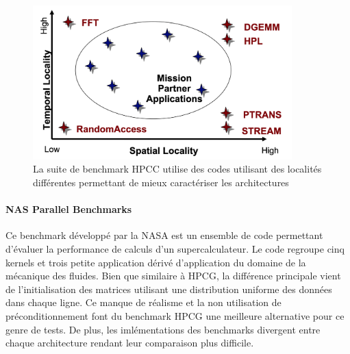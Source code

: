 \begin{figure}
    \center
    \includegraphics[width=10cm]{images/bench_hpcc.png}
    \caption{ La suite de benchmark HPCC utilise des codes utilisant des localités différentes permettant de mieux caractériser les architectures
    \label{pic_bench_hpcc}}
\end{figure}





\paragraph{NAS Parallel Benchmarks} Ce benchmark développé par la NASA est un ensemble de code permettant d'évaluer la performance de calculs d'un supercalculateur. Le code regroupe cinq kernels et trois petite application dérivé d'application du domaine de la mécanique des fluides. Bien que similaire à HPCG, la différence principale vient de l'initialisation des matrices utilisant une distribution uniforme des données dans chaque ligne. Ce manque de réalisme et la non utilisation de préconditionnement font du benchmark HPCG une meilleure alternative pour ce genre de tests. De plus, les imlémentations des benchmarks divergent entre chaque architecture rendant leur comparaison plus difficile.




